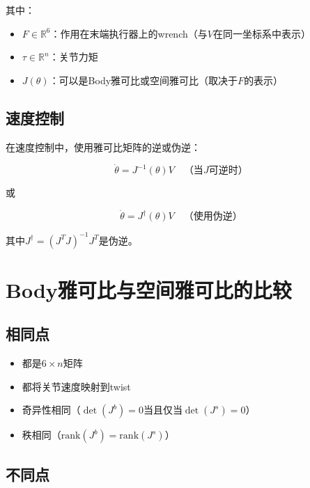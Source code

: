 \documentclass[12pt,a4paper]{article}
\begin{document}
其中：
\begin{itemize}
\item $F \in \mathbb{R}^6$：作用在末端执行器上的wrench（与$V$在同一坐标系中表示）
\item $\tau \in \mathbb{R}^n$：关节力矩
\item $J(\theta)$：可以是Body雅可比或空间雅可比（取决于$F$的表示）
\end{itemize}

\subsection{速度控制}

在速度控制中，使用雅可比矩阵的逆或伪逆：

\begin{equation}
\dot{\theta} = J^{-1}(\theta) V \quad \text{（当$J$可逆时）}
\end{equation}

或

\begin{equation}
\dot{\theta} = J^{\dagger}(\theta) V \quad \text{（使用伪逆）}
\end{equation}

其中$J^{\dagger} = (J^T J)^{-1}J^T$是伪逆。

\section{Body雅可比与空间雅可比的比较}

\subsection{相同点}

\begin{itemize}
\item 都是$6 \times n$矩阵
\item 都将关节速度映射到twist
\item 奇异性相同（$\det(J^b) = 0$当且仅当$\det(J^s) = 0$）
\item 秩相同（$\text{rank}(J^b) = \text{rank}(J^s)$）
\end{itemize}

\subsection{不同点}
\end{document}
